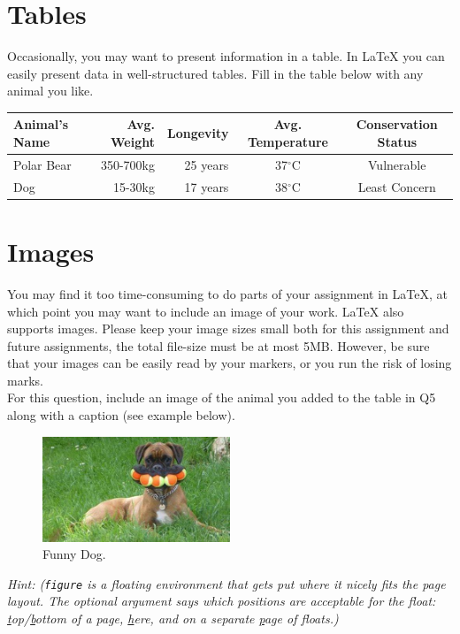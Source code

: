 \documentclass[12pt]{article}
\begin{document}
\section{Tables}
Occasionally, you may want to present information in a table. In \LaTeX{} you can easily
 present data in well-structured tables. 
Fill in the table below with any animal you like.\\

\begin{tabular}{ | l || r  | r | c | c |} \hline
  Animal's Name & Avg. Weight & Longevity & Avg. Temperature & Conservation Status  \\ \hline
   Polar Bear & 350-700kg & 25 years & 37$^{\circ}$C  & Vulnerable \\ \hline
   Dog & 15-30kg & 17 years & 38$^{\circ}$C  & Least Concern \\ \hline
\end{tabular}

\section{Images}
\label{sec:image}

You may find it too time-consuming to do parts of your assignment in \LaTeX{}, at which 
point you may want to include an image of your work. \LaTeX{} also supports images. 
Please keep your image sizes small both for this assignment and future assignments, the total file-size must be at most 5MB.  However, be sure that your images can be easily read by your markers, or you run the risk of losing marks. \\

For this question, include an image of the animal you added to the table in Q5 along with a caption (see example below).

\begin{figure}[tbhp]
	\begin{center}
		\includegraphics[width=0.5\textwidth]{funny_dog.jpg}
	\end{center}
	\caption{Funny Dog.}
	\label{figcaption}
\end{figure}

{\itshape Hint: (\texttt{figure} is a floating environment that gets put where it nicely fits the page layout. 
The optional argument says which positions are acceptable for the float: 
\underline{t}op/\underline{b}ottom of a page, \underline{h}ere, and on a separate \underline{p}age of floats.)}
\end{document}
